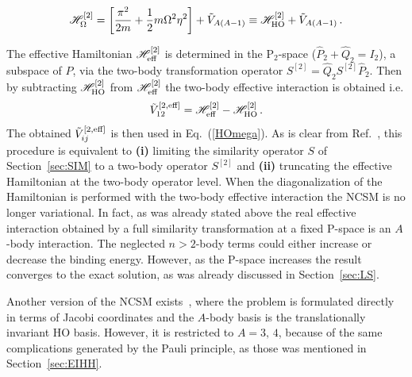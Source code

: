 \begin{equation}\label{HO2mega}
{\cal H}^{[2]}_\Omega = \left[ \frac{\mathbf{\pi}^2}{2 m}
+\frac{1}{2}m\Omega^2 \mathbf{\eta}^2\right ]+
\tilde V_{A(A-1)}
\equiv {\cal H}^{[2]}_{\rm HO} +\tilde V_{A(A-1)}  \,.
\end{equation}

 

The effective Hamiltonian ${\cal H}^{[2]}_{\rm eff}$ is determined in  
the P$_{2}$-space ($\hat P_2+ \hat Q_2 =I_2$), a subspace of $P$, via 
the two-body transformation operator $S^{[2]}=\hat Q_2 S^{[2]}  \hat P_2$. 
Then by subtracting ${\cal H}^{[2]}_{\rm HO}$ from ${\cal H}^{[2]}_{\rm eff}$ the two-body effective interaction is obtained  i.e. 
\begin{equation}
\tilde V_{12}^{[2,\rm eff]}  = {\cal H}^{[2]}_{\rm eff} - {\cal H}^{[2]}_{\rm HO}\,.
\end{equation}
The obtained  $\tilde V_{ij}^{[2,\rm eff]}$  is then used in Eq.~(\ref{HOmega}).
As is clear from Ref.~\cite{DaS64}, this procedure 
is equivalent to  {\bf (i)} limiting the similarity operator $S$ of Section~\ref{sec:SIM}   to
a  two-body operator $S^{[2]}$ and {\bf (ii)} truncating the effective Hamiltonian   at the two-body operator level. 
When the diagonalization of the Hamiltonian is performed with the two-body effective interaction the  NCSM is no longer  variational. 
In fact, as was already stated above the real effective interaction obtained by a full similarity transformation at a fixed P-space
is an $A$-body interaction. The neglected $n>2$-body terms  could either increase
or decrease the binding energy. However, as the P-space increases
the result converges to the exact solution, as was already discussed in Section~\ref{sec:LS}. 

Another version of the NCSM exists~\cite{NAV:1998}, where the problem is  formulated directly in terms of Jacobi coordinates 
and the $A$-body basis is 
the translationally invariant HO basis.  However, it is  restricted to $A=3,\,4$, 
because of the same complications generated by the Pauli principle, as those was mentioned in Section~\ref{sec:EIHH}.


